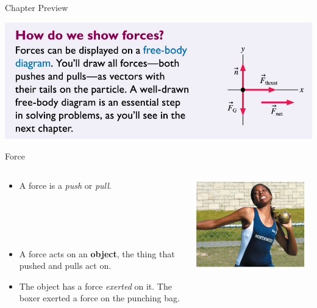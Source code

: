 \documentclass{beamer}
\begin{document}
\begin{frame}{Chapter Preview}
\begin{center}
   \includegraphics[width=\textwidth]{../figures/05_preview_03.png}
\end{center}
\end{frame}

\begin{frame}{Force}
\begin{columns}
\begin{column}{0.6\textwidth}
\begin{itemize}
   \item A force is a {\it push} or {\it pull}.
   \\~\\~\\~\\~\\
   \item A force acts on an {\bf object}, the thing that pushed and pulls act on.
   \item The object has a force {\it exerted} on it. The boxer exerted a force on the punching bag.
\end{itemize}
\end{column}
\begin{column}{0.4\textwidth}
\begin{center}
   \includegraphics[width=0.95\textwidth]{../figures/05_Pg111_UnFigure1.jpg}

\end{center}
\end{column}
\end{columns}
\end{frame}
\end{document}
